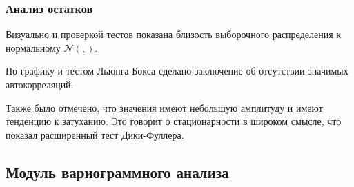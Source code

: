 \documentclass[notheorems]{beamer}
\theoremstyle{definition}
\theoremstyle{example}
\theoremstyle{plain}
\newcommand{\inp}[1]{}
\newcommand{\descriptive}[2]{\inp{#1/descriptive/#2}}
\newcommand{\resnormaldistr}{$\mathcal{N}(\descriptive{residual}{mean}, \descriptive{residual}{variance})$}
\begin{document}
\begin{frame}
  \frametitle{Анализ остатков}
    Визуально и проверкой тестов показана близость выборочного распределения к нормальному \resnormaldistr.

    \vspace{0.5em}

    По графику и тестом Льюнга-Бокса сделано заключение об отсутствии значимых автокорреляций.

    \vspace{0.5em}

    Также было отмечено, что значения имеют небольшую амплитуду и имеют тенденцию к затуханию. Это говорит о стационарности в широком смысле, что показал расширенный тест Дики-Фуллера.
\end{frame}

\subsection{Модуль вариограммного анализа}
\end{document}
